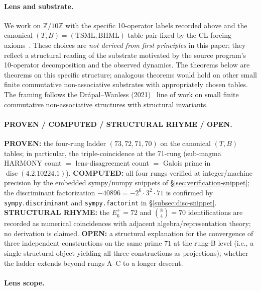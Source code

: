 \documentclass[11pt,reqno]{amsart}
\theoremstyle{definition}
\newcommand{\Z}{\mathbb{Z}}
\newcommand{\TSML}{\mathrm{TSML}}
\newcommand{\BHML}{\mathrm{BHML}}
\DeclareMathOperator{\disc}{disc}
\begin{document}
\paragraph{Lens and substrate.}
\label{sec:lens-subs}

We work on $\Z/10\Z$ with the specific 10-operator labels recorded
above and the canonical $(T, B) = (\TSML, \BHML)$ table pair fixed by
the CL forcing axioms~\cite{Sanders2026CLAxioms}. These choices are
\emph{not derived from first principles} in this paper; they reflect a
structural reading of the substrate motivated by the source program's
10-operator decomposition and the observed dynamics. The theorems
below are theorems on this specific structure; analogous theorems
would hold on other small finite commutative non-associative
substrates with appropriately chosen tables. The framing follows the
Drápal--Wanless (2021)~\cite{DrapalWanless2021} line of work on small
finite commutative non-associative structures with structural
invariants.

\paragraph{PROVEN / COMPUTED / STRUCTURAL RHYME / OPEN.}

\textbf{PROVEN:} the four-rung ladder $(73, 72, 71, 70)$ on the canonical
$(T, B)$ tables; in particular, the triple-coincidence at the
71-rung (sub-magma HARMONY count $=$ lens-disagreement count $=$ Galois
prime in $\disc(4.2.10224.1)$). \textbf{COMPUTED:} all four rungs
verified at integer/machine precision by the embedded sympy/numpy
snippets of §\ref{sec:verification-snippet}; the discriminant
factorization $-40896 = -2^6 \cdot 3^2 \cdot 71$ is confirmed by
\texttt{sympy.discriminant} and \texttt{sympy.factorint} in
§\ref{subsec:disc-snippet}. \textbf{STRUCTURAL RHYME:} the
$E_6^+ = 72$ and $\binom{8}{4} = 70$ identifications are recorded as
numerical coincidences with adjacent algebra/representation theory;
no derivation is claimed. \textbf{OPEN:} a structural explanation for
the convergence of three independent constructions on the same prime
$71$ at the rung-B level (i.e., a single structural object yielding
all three constructions as projections); whether the ladder extends
beyond rungs A--C to a longer descent.

\paragraph{Lens scope.}
\end{document}
